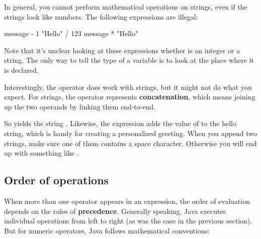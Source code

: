 
In general, you cannot perform mathematical operations on strings, even if the strings look like numbers.
The following expressions are illegal:

\begin{code}
    message - 1     "Hello" / 123     message * "Hello"
\end{code}

Note that it's unclear looking at these expressions whether  is an integer or a string.
The only way to tell the type of a variable is to look at the place where it is declared.


Interestingly, the \java{+} operator does work with strings, but it might not do what you expect.
For strings, the \java{+} operator represents {\bf concatenation}, which means joining up the two operands by linking them end-to-end.

So  yields the string .
Likewise, the expression  adds the value of  to the hello string, which is handy for creating a personalized greeting.
When you append two strings, make sure one of them contains a space character.
Otherwise you will end up with something like .

\subsection{Order of operations}


When more than one operator appears in an expression, the order of evaluation depends on the rules of {\bf precedence}.
Generally speaking, Java executes individual operations from left to right (as was the case in the previous section).
But for numeric operators, Java follows mathematical conventions:

